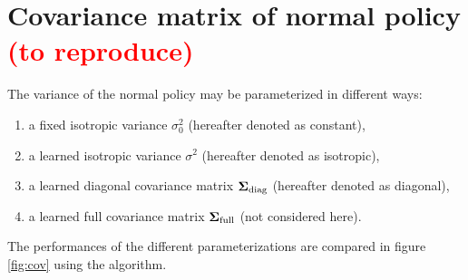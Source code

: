 

%

\section{Covariance matrix of normal policy \textcolor{red}{(to reproduce)}}

The variance of the normal policy may be parameterized in different ways:

\begin{enumerate}
	\item a fixed isotropic variance $\sigma_0^2$ (hereafter denoted as constant),
	\item a learned isotropic variance $\sigma^2$ (hereafter denoted as isotropic),
	\item a learned diagonal covariance matrix $\bm{\Sigma}_\text{diag}$ (hereafter denoted as diagonal),
	\item a learned full covariance matrix $\bm{\Sigma}_\text{full}$ (not considered here).
\end{enumerate}

The performances of the different parameterizations are compared in figure \ref{fig:cov} using the \ppo algorithm.



